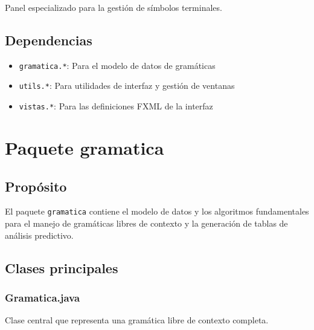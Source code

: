 Panel especializado para la gestión de símbolos terminales.

\subsection{Dependencias}

\begin{itemize}
    \item \texttt{gramatica.*}: Para el modelo de datos de gramáticas
    \item \texttt{utils.*}: Para utilidades de interfaz y gestión de ventanas
    \item \texttt{vistas.*}: Para las definiciones FXML de la interfaz
\end{itemize}

\section{Paquete gramatica}

\subsection{Propósito}

El paquete \texttt{gramatica} contiene el modelo de datos y los algoritmos fundamentales para el manejo de gramáticas libres de contexto y la generación de tablas de análisis predictivo.

\subsection{Clases principales}

\subsubsection{Gramatica.java}

Clase central que representa una gramática libre de contexto completa.

